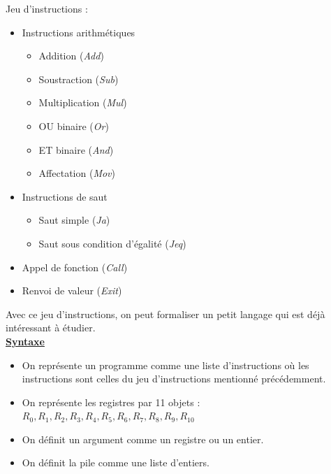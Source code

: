 \documentclass[a4paper,french, 12pt]{article}
\begin{document}
		Jeu d'instructions :
		\begin{itemize}
		\item Instructions arithmétiques
		\begin{itemize}
		\item Addition (\textit{Add})
		\item Soustraction (\textit{Sub})
		\item Multiplication (\textit{Mul})
		\item OU binaire (\textit{Or})
		\item ET binaire (\textit{And})
		\item Affectation (\textit{Mov})
		\end{itemize}
		\item Instructions de saut
		\begin{itemize}
		\item Saut simple (\textit{Ja})
		\item Saut sous condition d'égalité (\textit{Jeq})
		\end{itemize}
		\item Appel de fonction (\textit{Call})
		\item Renvoi de valeur (\textit{Exit})\\
		\end{itemize}

		Avec ce jeu d'instructions, on peut formaliser un petit langage qui est déjà intéressant à étudier.\\
		
		\noindent\textbf{\underline{Syntaxe}}\\

		\begin{itemize}
		\item On représente un programme comme une liste d'instructions où les instructions sont celles du jeu d'instructions mentionné précédemment.
		\item On représente les registres par 11 objets : $R_0, R_1, R_2, R_3 , R_4,  R_5,  R_6,  R_7,  R_8,  R_9,  R_{10}$\
		\item On définit un argument comme un registre ou un entier.
		\item On définit la pile comme une liste d'entiers.
		\end{itemize}
		
\end{document}
